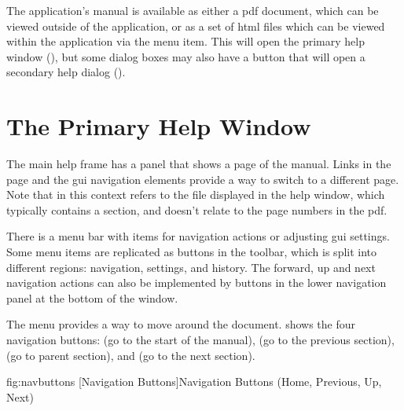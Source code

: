 
The application's manual is available as either a \gls{pdf}
document, which can be viewed outside of the application, or as a
set of \gls{html} files which can be viewed within the application
via the  menu item. This will open the primary
help window (), but some dialog boxes
may also have a  button that will open a secondary help
dialog ().

\section{The Primary Help Window}
\label{sec:primaryhelp}

The main help frame has a panel that shows a page of the manual.  Links
in the page and the \gls{gui} navigation elements provide a way to
switch to a different page.  Note that  in this context
refers to the file displayed in the help window, which typically
contains a section, and doesn't relate to the page numbers in the
\gls{pdf}.

There is a menu bar with items for navigation actions or adjusting
\gls{gui} settings. Some menu items are replicated as buttons in the
toolbar, which is split into different regions: navigation,
settings, and history. The forward, up and next navigation actions
can also be implemented by buttons in the lower navigation panel at
the bottom of the window.


The  menu provides a way to move around
the document.
 shows the four navigation
buttons:  (go to the start of the manual), 
 (go to the previous section), 
 (go to parent section), and 
 (go
to the next section).

\FloatFig
{fig:navbuttons}
{%
}
[Navigation Buttons]{Navigation Buttons (Home, Previous, Up, Next)}


